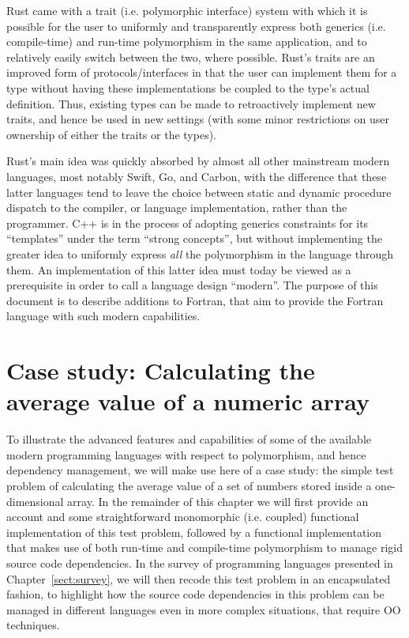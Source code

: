 \documentclass[11pt,oneside]{report}
\begin{document}
Rust came with a trait (i.e. polymorphic interface) system with which
it is possible for the user to uniformly and transparently express
both generics (i.e. compile-time) and run-time polymorphism in the
same application, and to relatively easily switch between the two,
where possible. Rust's traits are an improved form of
protocols/interfaces in that the user can implement them for a type
without having these implementations be coupled to the type's actual
definition. Thus, existing types can be made to retroactively
implement new traits, and hence be used in new settings (with some
minor restrictions on user ownership of either the traits or the
types).

Rust's main idea was quickly absorbed by almost all other mainstream
modern languages, most notably Swift, Go, and Carbon, with the
difference that these latter languages tend to leave the choice
between static and dynamic procedure dispatch to the compiler, or
language implementation, rather than the programmer. C++ is in the
process of adopting generics constraints for its ``templates'' under
the term ``strong concepts'', but without implementing the greater
idea to uniformly express \emph{all} the polymorphism in the language
through them. An implementation of this latter idea must today be
viewed as a prerequisite in order to call a language design
``modern''. The purpose of this document is to describe additions to
Fortran, that aim to provide the Fortran language with such modern
capabilities.

\chapter{Case study: Calculating the average value of a numeric array}

To illustrate the advanced features and capabilities of some of the
available modern programming languages with respect to polymorphism,
and hence dependency management, we will make use here of a case
study: the simple test problem of calculating the average value of a set
of numbers stored inside a one-dimensional array. In the remainder of
this chapter we will first provide an account and some straightforward
monomorphic (i.e. coupled) functional implementation of this test
problem, followed by a functional implementation that makes use of
both run-time and compile-time polymorphism to manage rigid source code
dependencies. In the survey of programming languages presented in
Chapter~\ref{sect:survey}, we will then recode this test problem in an
encapsulated fashion, to highlight how the source code dependencies in
this problem can be managed in different languages even in more
complex situations, that require OO techniques.
\end{document}
